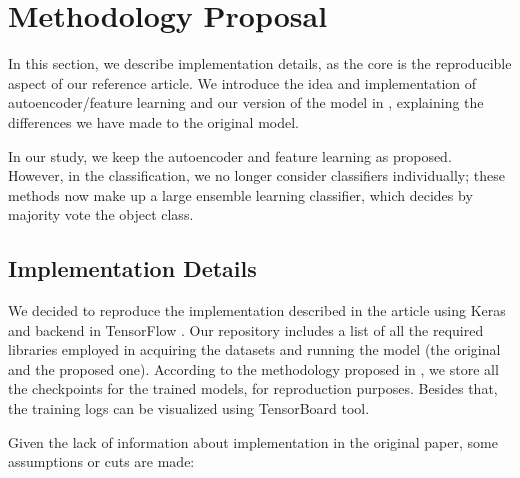 \section{Methodology Proposal}
\label{sec:propose}

In this section, we describe implementation details, as the core is the reproducible aspect of our reference article. We introduce the idea and implementation of autoencoder/feature learning and our version of the model in \cite{WenZha:2018}, explaining the differences we have made to the original model.

In our study, we keep the autoencoder and feature learning as proposed. However, in the classification, we no longer consider classifiers individually; these methods now make up a large ensemble learning classifier, which decides by majority vote the object class.

\subsection{Implementation Details}

We decided to reproduce the implementation described in the article using Keras \cite{chollet2018keras} and backend in TensorFlow \cite{tensorflow}. Our repository includes a list of all the required libraries employed in acquiring the datasets and running the model (the original and the proposed one). According to the methodology proposed in \cite{Fuente:2019}, we store all the checkpoints for the trained models, for reproduction purposes. Besides that, the training logs can be visualized using TensorBoard tool.

Given the lack of information about implementation in the original paper, some assumptions or cuts are made: 

